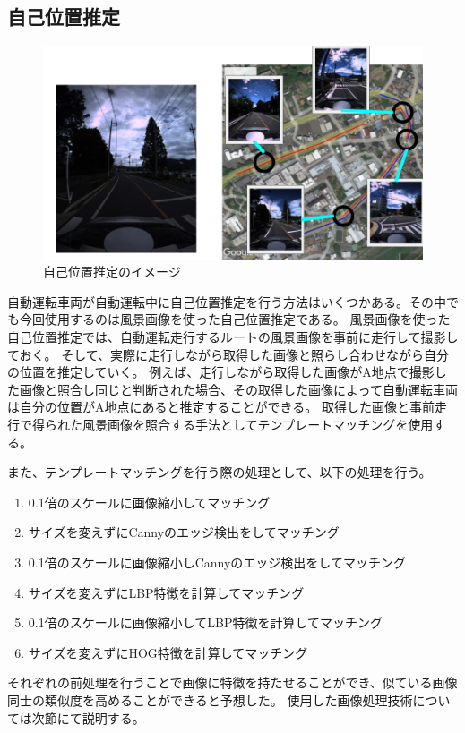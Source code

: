 \documentclass[titlepage,dvipdfmx]{jsarticle}
\begin{document}
\subsection{自己位置推定}
\begin{figure}[t]
  \centering
  \includegraphics[pagebox=cropbox, scale=0.4]{sotuken_png/positioning.png}
  \caption{自己位置推定のイメージ}
  \label{positioning}
\end{figure}
自動運転車両が自動運転中に自己位置推定を行う方法はいくつかある。その中でも今回使用するのは風景画像を使った自己位置推定である。
風景画像を使った自己位置推定では、自動運転走行するルートの風景画像を事前に走行して撮影しておく。
そして、実際に走行しながら取得した画像と照らし合わせながら自分の位置を推定していく。
例えば、走行しながら取得した画像がA地点で撮影した画像と照合し同じと判断された場合、その取得した画像によって自動運転車両は自分の位置がA地点にあると推定することができる。
取得した画像と事前走行で得られた風景画像を照合する手法としてテンプレートマッチングを使用する。

また、テンプレートマッチングを行う際の処理として、以下の処理を行う。
\begin{enumerate}
  \item 0.1倍のスケールに画像縮小してマッチング
  \item サイズを変えずにCannyのエッジ検出をしてマッチング
  \item 0.1倍のスケールに画像縮小しCannyのエッジ検出をしてマッチング
  \item サイズを変えずにLBP特徴を計算してマッチング
  \item 0.1倍のスケールに画像縮小してLBP特徴を計算してマッチング
  \item サイズを変えずにHOG特徴を計算してマッチング
\end{enumerate}
それぞれの前処理を行うことで画像に特徴を持たせることができ、似ている画像同士の類似度を高めることができると予想した。
使用した画像処理技術については次節にて説明する。
\end{document}
